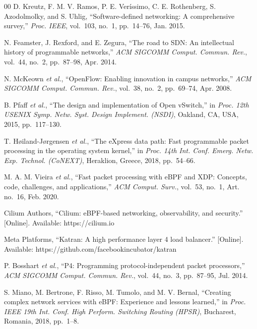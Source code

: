 \documentclass[conference]{IEEEtran}
\begin{document}
\begin{thebibliography}{00}
 D. Kreutz, F. M. V. Ramos, P. E. Ver\'issimo,
C. E. Rothenberg, S. Azodolmolky, and S. Uhlig, ``Software-defined networking:
A comprehensive survey,'' \textit{Proc. IEEE}, vol.~103, no.~1, pp.~14--76,
Jan. 2015.

 N. Feamster, J. Rexford, and E. Zegura, ``The road
to SDN: An intellectual history of programmable networks,'' \textit{ACM
SIGCOMM Comput. Commun. Rev.}, vol.~44, no.~2, pp.~87--98, Apr. 2014.

 N. McKeown \textit{et al.}, ``OpenFlow: Enabling
innovation in campus networks,'' \textit{ACM SIGCOMM Comput. Commun. Rev.},
vol.~38, no.~2, pp.~69--74, Apr. 2008.

 B. Pfaff \textit{et al.}, ``The design and
implementation of Open vSwitch,'' in \textit{Proc. 12th USENIX Symp. Netw.
Syst. Design Implement. (NSDI)}, Oakland, CA, USA, 2015, pp.~117--130.

 T. H{\o}iland-J{\o}rgensen \textit{et al.}, ``The
eXpress data path: Fast programmable packet processing in the operating system
kernel,'' in \textit{Proc. 14th Int. Conf. Emerg. Netw. Exp. Technol.
(CoNEXT)}, Heraklion, Greece, 2018, pp.~54--66.

 M. A. M. Vieira \textit{et al.}, ``Fast packet
processing with eBPF and XDP: Concepts, code, challenges, and applications,''
\textit{ACM Comput. Surv.}, vol.~53, no.~1, Art. no.~16, Feb. 2020.

 Cilium Authors, ``Cilium: eBPF-based networking,
observability, and security.'' [Online]. Available: https://cilium.io

 Meta Platforms, ``Katran: A high performance layer 4 load
balancer.'' [Online]. Available: https://github.com/facebookincubator/katran

 P. Bosshart \textit{et al.}, ``P4: Programming
protocol-independent packet processors,'' \textit{ACM SIGCOMM Comput. Commun.
Rev.}, vol.~44, no.~3, pp.~87--95, Jul. 2014.

 S. Miano, M. Bertrone, F. Risso, M. Tumolo, and
M. V. Bernal, ``Creating complex network services with eBPF: Experience and
lessons learned,'' in \textit{Proc. IEEE 19th Int. Conf. High Perform. Switching
Routing (HPSR)}, Bucharest, Romania, 2018, pp.~1--8.


\end{thebibliography}
\end{document}
